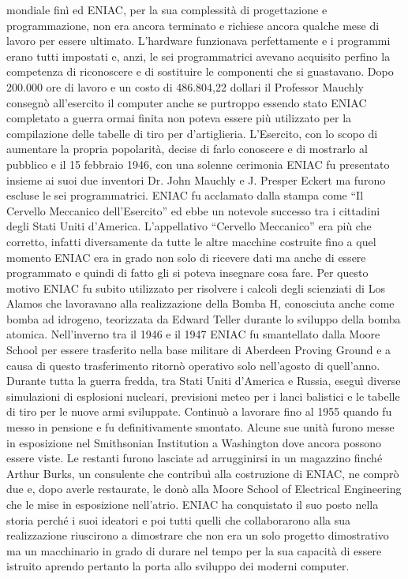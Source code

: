 mondiale finì ed ENIAC, per la sua complessità di progettazione e programmazione, non era ancora terminato e richiese ancora qualche mese di lavoro per essere ultimato. L’hardware funzionava perfettamente e i programmi erano tutti impostati e, anzi, le sei programmatrici avevano acquisito perfino la competenza di riconoscere e di sostituire le componenti che si guastavano. Dopo 200.000 ore di lavoro e un costo di 486.804,22 dollari il Professor Mauchly consegnò all’esercito il computer anche se purtroppo essendo stato ENIAC completato a guerra ormai finita non poteva essere più utilizzato per la compilazione delle tabelle di tiro per d’artiglieria. L’Esercito, con lo scopo di aumentare la propria popolarità, decise di farlo conoscere e di mostrarlo al pubblico e il 15 febbraio 1946, con una solenne cerimonia ENIAC fu presentato insieme ai suoi due inventori Dr. John Mauchly e J. Presper Eckert ma furono escluse le sei programmatrici. ENIAC fu acclamato dalla stampa come “Il Cervello Meccanico dell’Esercito” ed ebbe un notevole successo tra i cittadini degli Stati Uniti d’America. L’appellativo “Cervello Meccanico” era più che corretto, infatti diversamente da tutte le altre macchine costruite fino a quel momento ENIAC era in grado non solo di ricevere dati ma anche di essere programmato e quindi di fatto gli si poteva insegnare cosa fare. Per questo motivo ENIAC fu subito utilizzato per risolvere i calcoli degli scienziati di Los Alamos che lavoravano alla realizzazione della Bomba H, conosciuta anche come bomba ad idrogeno, teorizzata da Edward Teller durante lo sviluppo della bomba atomica. Nell’inverno tra il 1946 e il 1947 ENIAC fu smantellato dalla Moore School per essere trasferito nella base militare di Aberdeen Proving Ground e a causa di questo trasferimento ritornò operativo solo nell’agosto di quell’anno. Durante tutta la guerra fredda, tra Stati Uniti d’America e Russia, eseguì diverse simulazioni di esplosioni nucleari, previsioni meteo per i lanci balistici e le tabelle di tiro per le nuove armi sviluppate. Continuò a lavorare fino al 1955 quando fu messo in pensione e fu definitivamente smontato. Alcune sue unità furono messe in esposizione nel Smithsonian Institution a Washington dove ancora possono essere viste. Le restanti furono lasciate ad arrugginirsi in un magazzino finché Arthur Burks, un consulente che contribuì alla costruzione di ENIAC, ne comprò due e, dopo averle restaurate, le donò alla Moore School of Electrical Engineering che le mise in esposizione nell’atrio. ENIAC ha conquistato il suo posto nella storia perché i suoi ideatori e poi tutti quelli che collaborarono alla sua realizzazione riuscirono a dimostrare che non era un solo progetto dimostrativo ma un macchinario in grado di durare nel tempo per la sua capacità di essere istruito aprendo pertanto la porta allo sviluppo dei moderni computer.